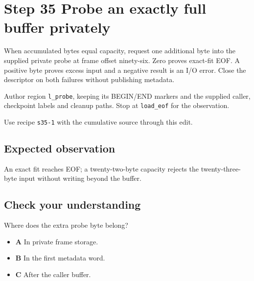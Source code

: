 \section{Step 35 Probe an exactly full buffer privately}\label{ppm-s35}

When accumulated bytes equal capacity, request one additional byte into the supplied private probe at frame offset ninety-six. Zero proves exact-fit EOF. A positive byte proves excess input and a negative result is an I/O error. Close the descriptor on both failures without publishing metadata.

Author region \texttt{l\_probe}, keeping its BEGIN/END markers and the supplied caller, checkpoint labels and cleanup paths. Stop at \texttt{load\_eof} for the observation.

Use recipe \texttt{s35-1} with the cumulative source through this edit.

\subsection{Expected observation}
An exact fit reaches EOF; a twenty-two-byte capacity rejects the twenty-three-byte input without writing beyond the buffer.

\subsection{Check your understanding}
Where does the extra probe byte belong?

\begin{itemize}
  \item \textbf{A} In private frame storage.
  \item \textbf{B} In the first metadata word.
  \item \textbf{C} After the caller buffer.
\end{itemize}
